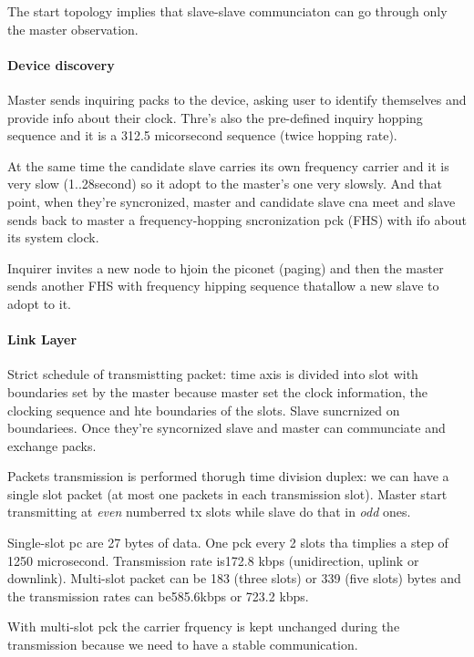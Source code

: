 The start topology implies that slave-slave communciaton can go through only the master observation.

\paragraph{Device discovery}
Master sends inquiring packs to the device, asking user to identify themselves and provide info about their clock. Thre's also the pre-defined inquiry hopping sequence and it is a 312.5 micorsecond sequence (twice hopping rate).

At the same time the candidate slave carries its own frequency carrier and it is very slow (1..28second) so it adopt to the master's one very slowsly.
And that point, when they're syncronized, master and candidate slave cna meet and slave sends back to master a frequency-hopping sncronization pck (FHS) with ifo about its system clock.

Inquirer invites a new node to hjoin the piconet (paging) and then the master sends another FHS with frequency hipping sequence thatallow a new slave to adopt to it.

\paragraph{Link Layer}
Strict schedule of transmistting packet: time axis is divided into slot with boundaries set by the master because master set the clock information, the clocking sequence and hte boundaries of the slots.
Slave suncrnized on boundariees. Once they're syncornized slave and master can communciate and exchange packs.

Packets transmission is performed thorugh time division duplex: we can have a single slot packet (at most one packets in each transmission slot). Master start transmitting at \emph{even} numberred tx slots while slave do that in \emph{odd} ones.

Single-slot pc are 27 bytes of data. One pck every 2 slots tha timplies a step of 1250 microsecond. Transmission rate is172.8 kbps (unidirection, uplink or downlink). Multi-slot packet can be 183 (three slots) or 339 (five slots) bytes and the transmission rates can be585.6kbps or 723.2 kbps.

With multi-slot pck the carrier frquency is kept unchanged during the transmission because we need to have a stable communication.


